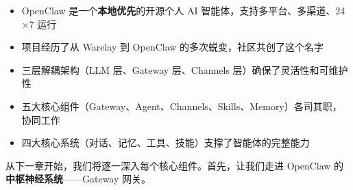 \begin{itemize}
  \item OpenClaw 是一个\textbf{本地优先}的开源个人 AI 智能体，支持多平台、多渠道、24$\times$7 运行
  \item 项目经历了从 Warelay 到 OpenClaw 的多次蜕变，社区共创了这个名字
  \item 三层解耦架构（LLM 层、Gateway 层、Channels 层）确保了灵活性和可维护性
  \item 五大核心组件（Gateway、Agent、Channels、Skills、Memory）各司其职，协同工作
  \item 四大核心系统（对话、记忆、工具、技能）支撑了智能体的完整能力
\end{itemize}

\noindent 从下一章开始，我们将逐一深入每个核心组件。首先，让我们走进 OpenClaw 的\textbf{中枢神经系统}——Gateway 网关。
